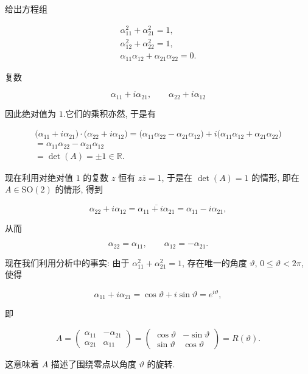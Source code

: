 给出方程组

\[
\begin{array}{c}
\alpha_{11}^2 + \alpha_{21}^2 = 1, \\
\alpha_{12}^2 + \alpha_{22}^2 = 1, \\
\alpha_{11}\alpha_{12} + \alpha_{21}\alpha_{22} = 0\text{.}
\end{array}
\]

复数

\[
\alpha_{11} + i\alpha_{21}, \qquad \alpha_{22} + i\alpha_{12}
\]

因此绝对值为 $1$.它们的乘积亦然, 于是有

\[
\begin{array}{c}
\bigl(\alpha_{11} + i\alpha_{21}\bigr) \cdot \bigl(\alpha_{22} + i\alpha_{12}\bigr) = \bigl(\alpha_{11}\alpha_{22} - \alpha_{21}\alpha_{12}\bigr) + i\bigl(\alpha_{11}\alpha_{12} + \alpha_{21}\alpha_{22}\bigr) \\
= \alpha_{11}\alpha_{22} - \alpha_{21}\alpha_{12} \\
= \det(A) = \pm 1 \in \mathbb{R}\text{.}
\end{array}
\]

现在利用对绝对值 $1$ 的复数 $z$ 恒有 $z\overline{z} = 1$, 于是在 $\det(A) = 1$ 的情形, 即在 $A \in \mathrm{SO}(2)$ 的情形, 得到

\[
\alpha_{22} + i\alpha_{12} = \overline{\alpha_{11} + i\alpha_{21}} = \alpha_{11} - i\alpha_{21},
\]

从而

\[
\alpha_{22} = \alpha_{11}, \qquad \alpha_{12} = -\alpha_{21}\text{.}
\]

现在我们利用分析中的事实: 由于 $\alpha_{11}^2 + \alpha_{21}^2 = 1$, 存在唯一的角度 $\vartheta$, $0 \leq \vartheta < 2\pi$, 使得

\[
\alpha_{11} + i\alpha_{21} = \cos \vartheta + i \sin \vartheta = e^{i\vartheta},
\]

即

\[
A = \begin{pmatrix} \alpha_{11} & -\alpha_{21} \\ \alpha_{21} & \alpha_{11} \end{pmatrix} = \begin{pmatrix} \cos \vartheta & -\sin \vartheta \\ \sin \vartheta & \cos \vartheta \end{pmatrix} = R(\vartheta)\text{.}
\]

这意味着 $A$ 描述了围绕零点以角度 $\vartheta$ 的旋转.

